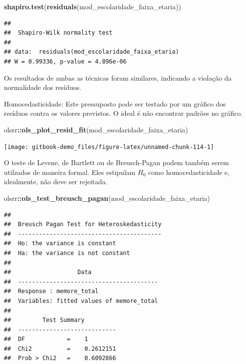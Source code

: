 \documentclass[
]{book}
\newenvironment{Shaded}{\begin{snugshade}}{\end{snugshade}}
\newcommand{\KeywordTok}[1]{\textcolor[rgb]{0.13,0.29,0.53}{\textbf{#1}}}
\newcommand{\NormalTok}[1]{#1}
\newcommand{\OperatorTok}[1]{\textcolor[rgb]{0.81,0.36,0.00}{\textbf{#1}}}
\begin{document}
\begin{Shaded}
\begin{Highlighting}[]
\KeywordTok{shapiro.test}\NormalTok{(}\KeywordTok{residuals}\NormalTok{(mod_escolaridade_faixa_etaria))}
\end{Highlighting}
\end{Shaded}

\begin{verbatim}
## 
##  Shapiro-Wilk normality test
## 
## data:  residuals(mod_escolaridade_faixa_etaria)
## W = 0.99336, p-value = 4.896e-06
\end{verbatim}

Os resultados de ambas as técnicas foram similares, indicando a violação
da normalidade dos resíduos.

Homocedasticidade: Este pressuposto pode ser testado por um gráfico dos
resíduos contra os valores previstos. O ideal é não encontrar padrões no
gráfico.

\begin{Shaded}
\begin{Highlighting}[]
\NormalTok{olsrr}\OperatorTok{::}\KeywordTok{ols_plot_resid_fit}\NormalTok{(mod_escolaridade_faixa_etaria)}
\end{Highlighting}
\end{Shaded}

\begin{center}\texttt{[image: gitbook-demo\_files/figure-latex/unnamed-chunk-114-1]} \end{center}

O teste de Levene, de Bartlett ou de Breusch-Pagan podem também serem
utilzados de maneira formal. Eles estipulam \(H_0\) como
homocedasticidade e, idealmente, não deve ser rejeitada.

\begin{Shaded}
\begin{Highlighting}[]
\NormalTok{olsrr}\OperatorTok{::}\KeywordTok{ols_test_breusch_pagan}\NormalTok{(mod_escolaridade_faixa_etaria)}
\end{Highlighting}
\end{Shaded}

\begin{verbatim}
## 
##  Breusch Pagan Test for Heteroskedasticity
##  -----------------------------------------
##  Ho: the variance is constant            
##  Ha: the variance is not constant        
## 
##                   Data                   
##  ----------------------------------------
##  Response : memore_total 
##  Variables: fitted values of memore_total 
## 
##         Test Summary         
##  ----------------------------
##  DF            =    1 
##  Chi2          =    0.2612151 
##  Prob > Chi2   =    0.6092866
\end{verbatim}
\end{document}
